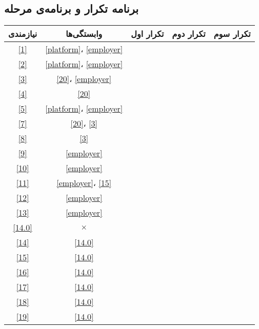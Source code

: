 \documentclass[12pt]{report}
\begin{document}
			\subsection{برنامه تکرار و برنامه‌ی مرحله}
				\begin{center}
					\begin{longtable}{|c|c|c|c|c|}
						\hline
						نیازمندی & وابستگی‌ها & تکرار اول & تکرار دوم & تکرار سوم \\
						\hline
						\hline
						\ref{1} & \ref{platform}، \ref{employer} & & & \\ \hline
						\ref{2} & \ref{platform}، \ref{employer} & \checkmark & & \\ \hline
						\ref{3} & \ref{20}، \ref{employer} & \checkmark & & \\ \hline
						\ref{4} & \ref{20} & \checkmark & & \\ \hline
						\ref{5} & \ref{platform}، \ref{employer} & \checkmark & & \\ \hline
						\ref{7} & \ref{20}، \ref{3} & & & \\ \hline
						\ref{8} & \ref{3} & \checkmark & & \\ \hline
						\ref{9} & \ref{employer} & \checkmark & & \\ \hline
						\ref{10} & \ref{employer} & \checkmark & & \\ \hline
						\ref{11} & \ref{employer}، \ref{15} & \checkmark & & \\ \hline
						\ref{12} & \ref{employer} & & & \\ \hline
						\ref{13} & \ref{employer} & \checkmark & & \\ \hline
						
						\ref{14.0} & $\times$ & \checkmark & & \\ \hline
						\ref{14} & \ref{14.0} & \checkmark & & \\ \hline
						\ref{15} & \ref{14.0} & \checkmark & & \\ \hline
						\ref{16} & \ref{14.0} & \checkmark & & \\ \hline
						\ref{17} & \ref{14.0} & \checkmark & & \\ \hline
						\ref{18} & \ref{14.0} & \checkmark & & \\ \hline
						\ref{19} & \ref{14.0} & \checkmark & & \\ \hline
						

\end{longtable}
\end{center}
\end{document}
